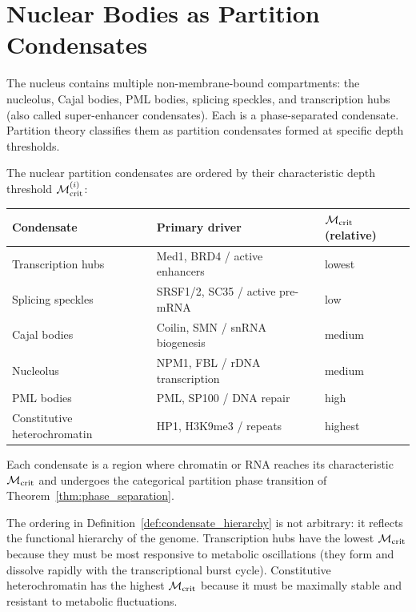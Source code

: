 \section{Nuclear Bodies as Partition Condensates}
\label{sec:nuclear_bodies}

The nucleus contains multiple non-membrane-bound compartments: the nucleolus,
Cajal bodies, PML bodies, splicing speckles, and transcription hubs (also
called super-enhancer condensates). Each is a phase-separated condensate.
Partition theory classifies them as partition condensates formed at specific
depth thresholds.

\begin{definition}
\label{def:condensate_hierarchy}
The nuclear partition condensates are ordered by their characteristic depth
threshold $\mathcal{M}_{\mathrm{crit}}^{(i)}$:
\begin{center}
\begin{tabular}{lll}
\toprule
Condensate & Primary driver & $\mathcal{M}_{\mathrm{crit}}$ (relative) \\
\midrule
Transcription hubs & Med1, BRD4 / active enhancers & lowest \\
Splicing speckles & SRSF1/2, SC35 / active pre-mRNA & low \\
Cajal bodies & Coilin, SMN / snRNA biogenesis & medium \\
Nucleolus & NPM1, FBL / rDNA transcription & medium \\
PML bodies & PML, SP100 / DNA repair & high \\
Constitutive heterochromatin & HP1, H3K9me3 / repeats & highest \\
\bottomrule
\end{tabular}
\end{center}
Each condensate is a region where chromatin or RNA reaches its characteristic
$\mathcal{M}_{\mathrm{crit}}$ and undergoes the categorical partition phase
transition of Theorem~\ref{thm:phase_separation}.
\end{definition}

The ordering in Definition~\ref{def:condensate_hierarchy} is not arbitrary:
it reflects the functional hierarchy of the genome. Transcription hubs have
the lowest $\mathcal{M}_{\mathrm{crit}}$ because they must be most responsive to
metabolic oscillations (they form and dissolve rapidly with the transcriptional
burst cycle). Constitutive heterochromatin has the highest $\mathcal{M}_{\mathrm{crit}}$
because it must be maximally stable and resistant to metabolic fluctuations.

